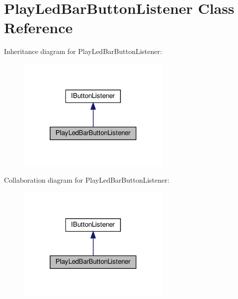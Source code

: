 \hypertarget{classPlayLedBarButtonListener}{}\section{Play\+Led\+Bar\+Button\+Listener Class Reference}
\label{classPlayLedBarButtonListener}


Inheritance diagram for Play\+Led\+Bar\+Button\+Listener\+:
\nopagebreak
\begin{figure}[H]
\begin{center}
\leavevmode
\includegraphics[width=210pt]{classPlayLedBarButtonListener__inherit__graph}
\end{center}
\end{figure}


Collaboration diagram for Play\+Led\+Bar\+Button\+Listener\+:
\nopagebreak
\begin{figure}[H]
\begin{center}
\leavevmode
\includegraphics[width=210pt]{classPlayLedBarButtonListener__coll__graph}
\end{center}
\end{figure}

